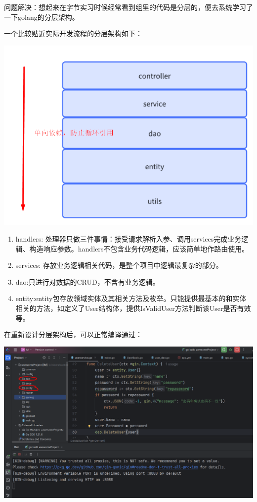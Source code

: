 \documentclass[12pt]{article}
\begin{document}
	问题解决：想起来在字节实习时候经常看到组里的代码是分层的，便去系统学习了一下golang的分层架构。
	
	一个比较贴近实际开发流程的分层架构如下：
	
	\includegraphics[scale=0.7]{7.png}
	
	\begin{enumerate}
		\item handlers: 处理器只做三件事情：接受请求解析入参、调用services完成业务逻辑、构造响应参数。handlers不包含业务代码逻辑，应该简单地作路由使用。
		\item services: 存放业务逻辑相关代码，是整个项目中逻辑最复杂的部分。
		\item dao:只进行对数据的CRUD，不含有业务逻辑。
		\item entity:entity包存放领域实体及其相关方法及枚举。只能提供最基本的和实体相关的方法，如定义了User结构体，提供IsValidUser方法判断该User是否有效等。
	\end{enumerate}
	
	在重新设计分层架构后，可以正常编译通过：
	
	\includegraphics[scale=0.5]{8.png}
	
\end{document}
